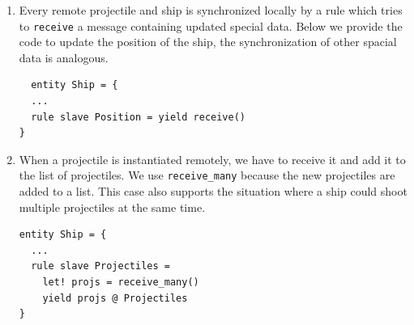 \begin{enumerate}[leftmargin=*,labelsep=3mm,label=\roman*]
	\item Every remote projectile and ship is synchronized locally by a rule which tries to \texttt{receive} a message containing updated special data. Below we provide the code to update the position of the ship, the synchronization of other spacial data is analogous.
	
\begin{lstlisting}
  entity Ship = {
  ...
  rule slave Position = yield receive()
}
\end{lstlisting}
	
	\item When a projectile is instantiated remotely, we have to receive it and add it to the list of projectiles. We use \texttt{receive\_many} because the new projectiles are added to a list. This case also supports the situation where a ship could shoot multiple projectiles at the same time.
	
\begin{lstlisting}
entity Ship = {
  ...
  rule slave Projectiles =
    let! projs = receive_many()
    yield projs @ Projectiles
}
\end{lstlisting} 
\end{enumerate}